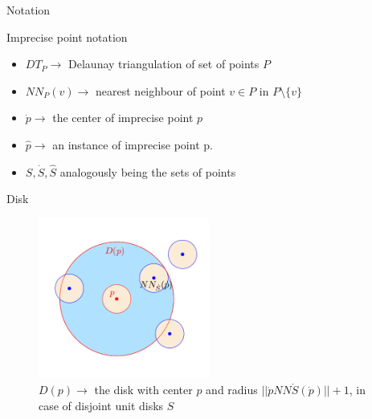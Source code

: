 \documentclass{beamer}
\begin{document}
\begin{frame}{Notation}
\begin{block}{Imprecise point notation}
\begin{itemize}
\item $DT_P \rightarrow $ Delaunay triangulation of set of points $P$
\item $NN_P(v) \rightarrow $ nearest neighbour of point $v \in P$ in $P \setminus \{v\}$
\item $\dot{p} \rightarrow $ the center of imprecise point $p$
\item $\hat{p} \rightarrow $ an instance of imprecise point p.
\item $S, \dot{S}, \hat{S} $ analogously being the sets of points 
\end{itemize}
\end{block}
\end{frame}

\begin{frame}{Disk}
\begin{figure}
\centering
\includegraphics[width=0.5\textwidth]{img/diskNotation.png}
\caption{$D(p) \rightarrow $ the disk with center $p$ and radius $||\dot{p} NN\dot{S}(\dot{p})|| + 1$, in case of disjoint unit disks $S$
}
\end{figure}




\end{frame}
\end{document}

